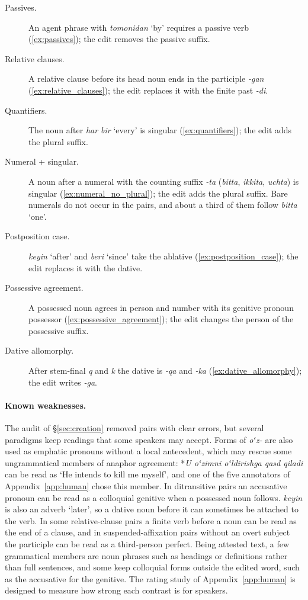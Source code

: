 \documentclass[11pt]{article}
\newcommand{\ungr}[1]{*\textit{#1}}
\newcommand{\uz}[1]{\textit{#1}}
\begin{document}
\begin{description}
\item[Passives.] An agent phrase with \uz{tomonidan} `by' requires a passive verb (\ref{ex:passives}); the edit removes the passive suffix.
\item[Relative clauses.] A relative clause before its head noun ends in the participle \uz{-gan} (\ref{ex:relative_clauses}); the edit replaces it with the finite past \uz{-di}.
\item[Quantifiers.] The noun after \uz{har bir} `every' is singular (\ref{ex:quantifiers}); the edit adds the plural suffix.
\item[Numeral + singular.] A noun after a numeral with the counting suffix \uz{-ta} (\uz{bitta}, \uz{ikkita}, \uz{uchta}) is singular (\ref{ex:numeral_no_plural}); the edit adds the plural suffix. Bare numerals do not occur in the pairs, and about a third of them follow \uz{bitta} `one'.
\item[Postposition case.] \uz{keyin} `after' and \uz{beri} `since' take the ablative (\ref{ex:postposition_case}); the edit replaces it with the dative.
\item[Possessive agreement.] A possessed noun agrees in person and number with its genitive pronoun possessor (\ref{ex:possessive_agreement}); the edit changes the person of the possessive suffix.
\item[Dative allomorphy.] After stem-final \uz{q} and \uz{k} the dative is \uz{-qa} and \uz{-ka} (\ref{ex:dative_allomorphy}); the edit writes \uz{-ga}.
\end{description}

\paragraph{Known weaknesses.} The audit of \S\ref{sec:creation} removed pairs with clear errors, but several paradigms keep readings that some speakers may accept. Forms of \uz{oʻz-} are also used as emphatic pronouns without a local antecedent, which may rescue some ungrammatical members of anaphor agreement: \ungr{U oʻzimni oʻldirishga qasd qiladi} can be read as `He intends to kill me myself', and one of the five annotators of Appendix~\ref{app:human} chose this member. In ditransitive pairs an accusative pronoun can be read as a colloquial genitive when a possessed noun follows. \uz{keyin} is also an adverb `later', so a dative noun before it can sometimes be attached to the verb. In some relative-clause pairs a finite verb before a noun can be read as the end of a clause, and in suspended-affixation pairs without an overt subject the participle can be read as a third-person perfect. Being attested text, a few grammatical members are noun phrases such as headings or definitions rather than full sentences, and some keep colloquial forms outside the edited word, such as the accusative for the genitive. The rating study of Appendix~\ref{app:human} is designed to measure how strong each contrast is for speakers.
\end{document}
